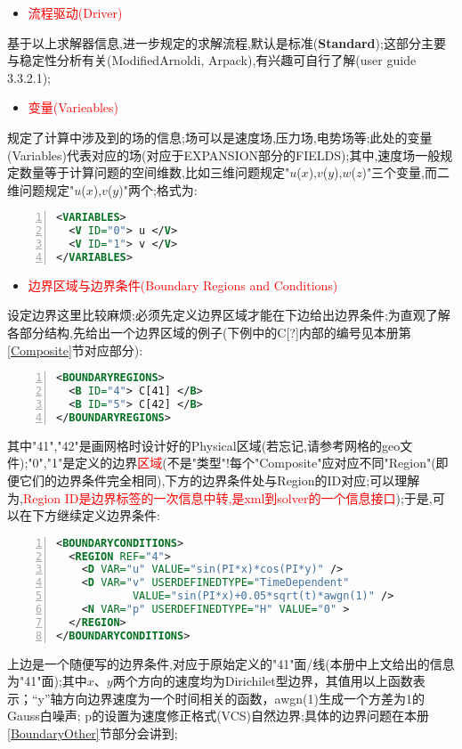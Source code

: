 \begin{itemize}
	\item{\textcolor{red}{流程驱动(Driver)}}
\end{itemize}
基于以上求解器信息,进一步规定的求解流程,默认是标准(\textbf{Standard});这部分主要与稳定性分析有关(ModifiedArnoldi, Arpack),有兴趣可自行了解(user guide 3.3.2.1);

\begin{itemize}
	\item{\textcolor{red}{变量(Varieables)}}
\end{itemize}
规定了计算中涉及到的场的信息;场可以是速度场,压力场,电势场等;此处的变量(Variables)代表对应的场(对应于EXPANSION部分的FIELDS);其中,速度场一般规定数量等于计算问题的空间维数,比如三维问题规定"$u$($x$),$v$($y$),$w$($z$)"三个变量,而二维问题规定"$u$($x$),$v$($y$)"两个;格式为:
\begin{lstlisting}[frame=single,numbers=left,language=XML]
<VARIABLES>
  <V ID="0"> u </V>
  <V ID="1"> v </V>
</VARIABLES>
\end{lstlisting}
\par

\begin{itemize}
	\item{\textcolor{red}{边界区域与边界条件(Boundary Regions and Conditions)}}
\end{itemize}
\par
设定边界这里比较麻烦;必须先定义边界区域才能在下边给出边界条件;为直观了解各部分结构,先给出一个边界区域的例子(下例中的C[?]内部的编号见本册第\ref{Composite}节对应部分):
\begin{lstlisting}[frame=single,numbers=left,language=XML]
<BOUNDARYREGIONS>
  <B ID="4"> C[41] </B>
  <B ID="5"> C[42] </B>
</BOUNDARYREGIONS>
\end{lstlisting}
\par
其中"41","42"是画网格时设计好的Physical区域(若忘记,请参考网格的geo文件);"0","1"是定义的边界\textcolor{red}{区域}(不是"类型"!每个"Composite"应对应不同"Region"(即便它们的边界条件完全相同),下方的边界条件处与Region的ID对应;可以理解为,\textcolor{red}{Region ID是边界标签的一次信息中转,是xml到solver的一个信息接口});于是,可以在下方继续定义边界条件:\par
\begin{lstlisting}[frame=single,numbers=left,language=XML]
<BOUNDARYCONDITIONS>
  <REGION REF="4">
    <D VAR="u" VALUE="sin(PI*x)*cos(PI*y)" />
    <D VAR="v" USERDEFINEDTYPE="TimeDependent"
    		VALUE="sin(PI*x)+0.05*sqrt(t)*awgn(1)" />
    <N VAR="p" USERDEFINEDTYPE="H" VALUE="0" >
  </REGION>
</BOUNDARYCONDITIONS>
\end{lstlisting}
\par
上边是一个随便写的边界条件,对应于原始定义的"41"面/线(本册中上文给出的信息为"41"面);其中$x$、$y$两个方向的速度均为Dirichilet型边界，其值用以上函数表示；“y”轴方向边界速度为一个时间相关的函数，awgn(1)生成一个方差为1的Gauss白噪声; p的设置为速度修正格式(VCS)自然边界;具体的边界问题在本册\ref{BoundaryOther}节部分会讲到;

